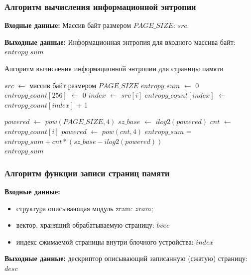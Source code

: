 \subsubsection{Алгоритм вычисления информационной энтропии}

\textbf{Входные данные:} Массив байт размером $PAGE\_SIZE$: $src$.

\textbf{Выходные данные:} Информационная энтропия для входного массива байт: $entropy\_sum$

\begin{algorithm}[H]
	\small
	\caption{Алгоритм вычисления информационной энтропии для страницы памяти}
	\label{alg:shannon_entropy}
	\begin{algorithmic}[1]
		\State $src$ $\gets$ массив байт размером $PAGE\_SIZE$
		\State $entropy\_sum$ $\gets$ 0
		\State $entropy\_count[256]$ $\gets$ 0
		\State $index$ $\gets$ $src[i]$
		\State $entropy\_count[index]$ $\gets$ $entropy\_count[index]$ + 1 
		\EndFor
		
		\State $powered$ $\gets$ $pow(PAGE\_SIZE, 4)$ 
		\State $sz\_base$ $\gets$  $ilog2(powered)$ 
		\State $cnt$ $\gets$ $entropy\_count[i]$
		\State $powered$ $\gets$ $pow(cnt, 4)$
		\State $entropy\_sum$ = $entropy\_sum + cnt * (sz\_base - ilog2(powered))$
		\EndIf
		\EndFor\\
		\Return $entropy\_sum$
	\end{algorithmic}
\end{algorithm}

\subsubsection{Алгоритм функции записи страниц памяти}

\textbf{Входные данные:} 

\begin{itemize}
	\item структура описывающая модуль zram: $zram$;
	\item вектор, хранящий обрабатываемую страницу: $bvec$
	\item индекс сжимаемой страницы внутри блочного устройства: $index$
\end{itemize}

\textbf{Выходные данные:} дескриптор описывающий записанную (сжатую) страницу: $desc$

